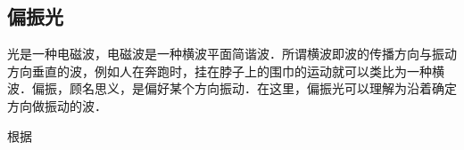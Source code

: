 
\subsection{偏振光}

光是一种电磁波，电磁波是一种横波平面简谐波．所谓横波即波的传播方向与振动方向垂直的波，例如人在奔跑时，挂在脖子上的围巾的运动就可以类比为一种横波．偏振，顾名思义，是偏好某个方向振动．在这里，偏振光可以理解为沿着确定方向做振动的波．

根据
